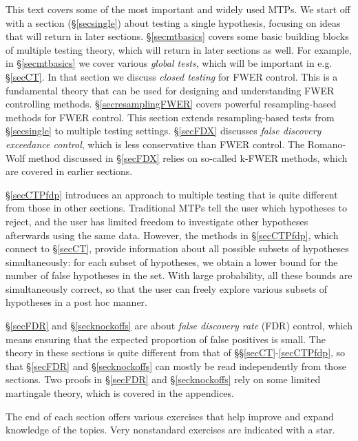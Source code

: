 \documentclass[11pt]{article}
\theoremstyle{plain}
\theoremstyle{definition}
\begin{document}
This text covers some of the most important and widely used MTPs. We start off with a section (\S\ref{secsingle}) about testing a single hypothesis, focusing on ideas that will return in later sections. \S\ref{secmtbasics} covers some basic building blocks of multiple testing theory, which will return in later sections as well. For example, in \S\ref{secmtbasics} we cover various \emph{global tests}, which will be important in e.g. \S\ref{secCT}. In that section we discuss \emph{closed testing} for FWER control. This is a fundamental theory that can be used for designing and understanding FWER controlling methods. \S\ref{secresamplingFWER} covers powerful resampling-based methods for FWER control. This section extends  resampling-based tests from \S\ref{secsingle} to multiple testing settings. \S\ref{secFDX} discusses \emph{false discovery exceedance control}, which is  less conservative than FWER control. The Romano-Wolf method discussed in  \S\ref{secFDX} relies on so-called k-FWER methods, which are covered in earlier sections.

\S\ref{secCTPfdp} introduces an approach to multiple testing that is quite different from those in other sections. Traditional MTPs tell the user which hypotheses to reject, and the user has limited freedom to investigate other hypotheses afterwards using the same data. However, the methods in \S\ref{secCTPfdp}, which connect to \S\ref{secCT}, provide information about all possible subsets of hypotheses simultaneously: for each subset of hypotheses, we obtain a lower bound for the number of false hypotheses in the set. With large probability, all these bounds are simultaneously correct, so that the user can freely explore various subsets of hypotheses in a post hoc manner.

\S\ref{secFDR} and \S\ref{secknockoffs}  are about \emph{false discovery rate} (FDR) control, which means ensuring that the expected proportion of false positives is small. The theory in these sections is quite different from that of \S\S\ref{secCT}-\ref{secCTPfdp}, so that \S\ref{secFDR} and \S\ref{secknockoffs} can mostly be read independently from those sections. Two proofs in \S\ref{secFDR} and \S\ref{secknockoffs} rely on some limited martingale theory, which is covered in the appendices.

The end of each section offers various exercises that help improve and expand knowledge of the topics. Very nonstandard exercises are indicated with a star. %
\end{document}
